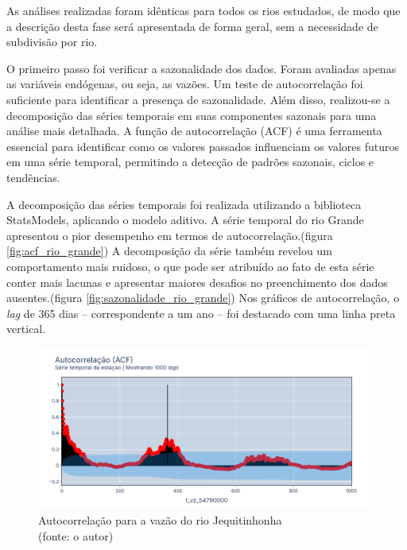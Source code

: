 As análises realizadas foram idênticas para todos os rios estudados, de modo que a descrição desta fase será apresentada de forma geral, sem a necessidade de subdivisão por rio.

O primeiro passo foi verificar a sazonalidade dos dados. Foram avaliadas apenas as variáveis endógenas, ou seja, as vazões. Um teste de autocorrelação foi suficiente para identificar a presença de sazonalidade. Além disso, realizou-se a decomposição das séries temporais em suas componentes sazonais para uma análise mais detalhada. A função de autocorrelação (ACF) é uma ferramenta essencial para identificar como os valores passados influenciam os valores futuros em uma série temporal, permitindo a detecção de padrões sazonais, ciclos e tendências.

A decomposição das séries temporais foi realizada utilizando a biblioteca StatsModels, aplicando o modelo aditivo.\cite{seabold2010statsmodels} A série temporal do rio Grande apresentou o pior desempenho em termos de autocorrelação.(figura \ref{fig:acf_rio_grande}) A decomposição da série também revelou um comportamento mais ruidoso, o que pode ser atribuído ao fato de esta série conter mais lacunas e apresentar maiores desafios no preenchimento dos dados ausentes.(figura \ref{fig:sazonalidade_rio_grande}) Nos gráficos de autocorrelação, o \textit{lag} de 365 dias – correspondente a um ano – foi destacado com uma linha preta vertical.

\begin{figure}[!h]
	\centering
	\includegraphics[scale=0.33]{Figuras/jequiti/acf_jequitinhonha.png}
	\caption{Autocorrelação para a vazão do rio Jequitinhonha\\(fonte: o autor)}
	\label{fig:acf_jequitinhonha}
\end{figure}

